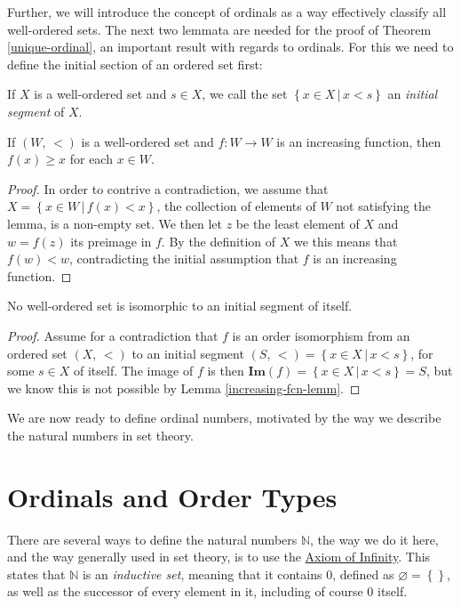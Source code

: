 \documentclass[../../main.tex]{subfiles}
\begin{document}
Further, we will introduce the concept of ordinals as a way effectively classify all well-ordered sets.
The next two lemmata are needed for the proof of Theorem \ref{unique-ordinal}, an important result with regards to ordinals.
For this we need to define the initial section of an ordered set first:

\begin{definition}
    If $X$ is a well-ordered set and $s \in X$, we call the set $\left\{x \in X \,\vert\, x < s\right\}$ an \textit{initial segment} of $X$.
\end{definition}

\begin{lemma}\label{increasing-fcn-lemm}\cite[Lemma 2.1, p.13]{Jec78}
    If $\left(W,\, <\right)$ is a well-ordered set and $f: W \to W$ is an increasing function, then $f(x) \geq x$ for each $x\in W$.
\end{lemma}

\begin{proof}\cite[Lemma 2.1, p.13]{Jec78}
    In order to contrive a contradiction, we assume that $X = \left\{x \in W \,\vert\, f(x) < x\right\}$, the collection of elements of $W$ not satisfying the lemma, is a non-empty set.
    We then let $z$ be the least element of $X$ and $w = f(z)$ its preimage in $f$.
    By the definition of $X$ we this means that $f(w) < w$, contradicting the initial assumption that $f$ is an increasing function.
\end{proof}

\begin{lemma}\cite[Lemma 2.2, p.13]{Jec78}
    No well-ordered set is isomorphic to an initial segment of itself.
\end{lemma}

\begin{proof}\cite[Lemma 2.2, p.13]{Jec78}
    Assume for a contradiction that $f$ is an order isomorphism from an ordered set $\left(X,\, <\right)$ to an initial segment $\left(S,\, <\right) = \left\{x \in X \,\vert\, x < s\right\}$, for some $s \in X$ of itself.
    The image of $f$ is then $\mathbf{Im}\left(f\right) = \left\{x \in X \,\vert\, x < s\right\} = S$, but we know this is not possible by Lemma \ref{increasing-fcn-lemm}. 
\end{proof}

We are now ready to define ordinal numbers, motivated by the way we describe the natural numbers in set theory.

\section{Ordinals and Order Types}
There are several ways to define the natural numbers $\mathbb{N}$, the way we do it here, and the way generally used in set theory, is to use the \hyperref[ZF7]{Axiom of Infinity}.
This states that $\mathbb{N}$ is an \textit{inductive set}, meaning that it contains $0$, defined as $\varnothing = \left\{\right\}$, as well as the successor of every element in it, including of course $0$ itself. \cite[p.39]{Gol17}
\end{document}
